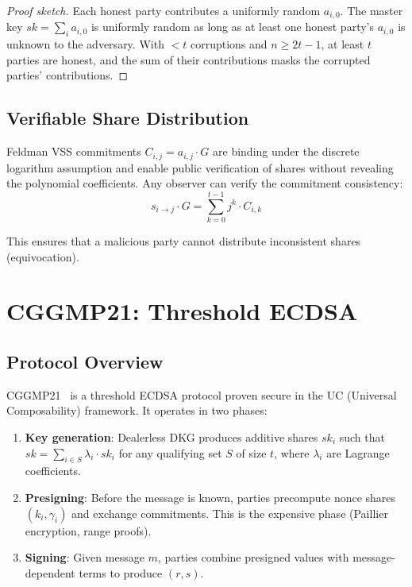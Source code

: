 \documentclass[11pt,a4paper]{article}
\begin{document}
\begin{proof}[Proof sketch]
Each honest party contributes a uniformly random $a_{i,0}$. The master key
$sk = \sum_i a_{i,0}$ is uniformly random as long as at least one honest party's
$a_{i,0}$ is unknown to the adversary. With $< t$ corruptions and $n \geq 2t - 1$,
at least $t$ parties are honest, and the sum of their contributions masks the
corrupted parties' contributions.
\end{proof}

\subsection{Verifiable Share Distribution}

Feldman VSS commitments $C_{i,j} = a_{i,j} \cdot G$ are binding under the discrete
logarithm assumption and enable public verification of shares without revealing the
polynomial coefficients. Any observer can verify the commitment consistency:
\[
  s_{i \to j} \cdot G = \sum_{k=0}^{t-1} j^k \cdot C_{i,k}
\]

This ensures that a malicious party cannot distribute inconsistent shares (equivocation).

\section{CGGMP21: Threshold ECDSA}
\label{sec:cggmp21}

\subsection{Protocol Overview}

CGGMP21~\cite{canetti2021uc} is a threshold ECDSA protocol proven secure in the
UC (Universal Composability) framework. It operates in two phases:

\begin{enumerate}[leftmargin=2em]
  \item \textbf{Key generation}: Dealerless DKG produces additive shares
        $sk_i$ such that $sk = \sum_{i \in S} \lambda_i \cdot sk_i$ for any
        qualifying set $S$ of size $t$, where $\lambda_i$ are Lagrange
        coefficients.
  \item \textbf{Presigning}: Before the message is known, parties precompute
        nonce shares $(k_i, \gamma_i)$ and exchange commitments. This is the
        expensive phase (Paillier encryption, range proofs).
  \item \textbf{Signing}: Given message $m$, parties combine presigned values
        with message-dependent terms to produce $(r, s)$.
\end{enumerate}
\end{document}
